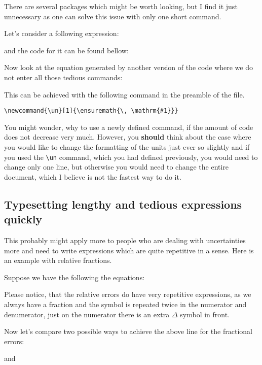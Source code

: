 \documentclass[
]{scrartcl}
\newcommand{\un}[1]{\unit{#1}}
\begin{document}
%
There are several packages which might be worth looking, but I find it just
    unnecessary as one can solve this issue with only one short command.

%
Let's consider a following expression:
%

    and the code for it can be found bellow:
%


%
Now look at the equation generated by another version of the code where we do
    not enter all those tedious commands:
%



%
This can be achieved with the following command in the preamble of the file.
%
\begin{lstlisting}
\newcommand{\un}[1]{\ensuremath{\, \mathrm{#1}}}
\end{lstlisting}

%
You might wonder, why to use a newly defined command, if the amount of code
    does not decrease very much. 
%
However, you \textbf{should} think about the case where you would like to change
    the formatting of the units just ever so slightly and if you used the
    \verb|\un| command, which you had defined previously, you would need to
    change only one line, but otherwise you would need to change the entire
    document, which I believe is not the fastest way to do it.

%
\subsection{Typesetting lengthy and tedious expressions quickly}

%
This probably might apply more to people who are dealing with uncertainties more
    and need to write expressions which are quite repetitive in a sense.
%
Here is an example with relative fractions.

%
Suppose we have the following the equations:


%
Please notice, that the relative errors do have very repetitive expressions,
    as we always have a fraction and the symbol is repeated twice in the
    numerator and denumerator, just on the numerator there is an extra $\Delta$
    symbol in front.

%
Now let's compare two possible ways to achieve the above line for the fractional
    errors:
%

and

\end{document}
